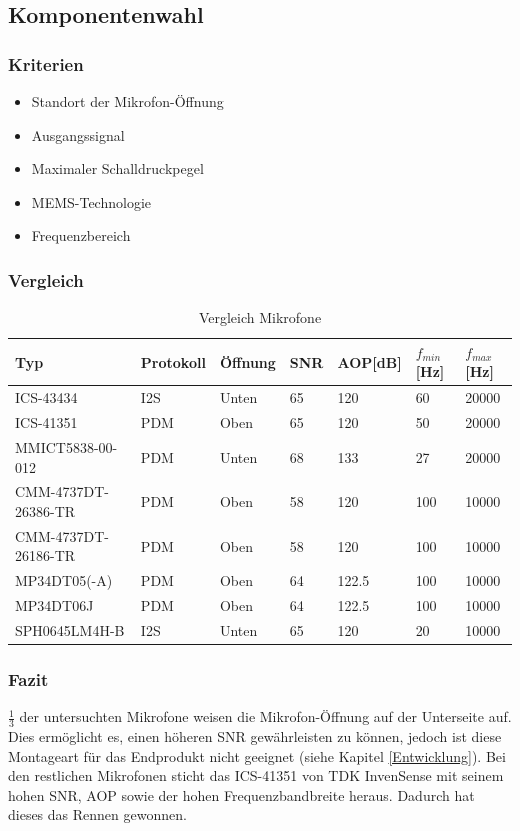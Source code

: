 \documentclass[12pt]{article}
\begin{document}
	\subsection{Komponentenwahl}
	\subsubsection{Kriterien}
	\begin{itemize}
		\item Standort der Mikrofon-Öffnung
		\item Ausgangssignal
		\item Maximaler Schalldruckpegel
		\item MEMS-Technologie
		\item Frequenzbereich
	\end{itemize}
	\subsubsection{Vergleich}
	\begin{table}[H]
		\centering
		\begin{tabular}{|l|l|l|l|l|l|l|}
			\hline
			\textbf{Typ} & \textbf{Protokoll} & \textbf{Öffnung} & \textbf{SNR} & \textbf{AOP[dB]} & \textbf{$f_{min}$ [Hz]} & \textbf{$f_{max}$[Hz]} \\\hline
	ICS-43434 & I2S & Unten & 65 & 120 & 60 & 20000 \\ \hline
	ICS-41351 & PDM & Oben & 65 & 120 & 50 & 20000 \\ \hline
	MMICT5838-00-012 & PDM & Unten & 68 & 133 & 27 & 20000 \\ \hline
	CMM-4737DT-26386-TR & PDM & Oben & 58 & 120 & 100 & 10000 \\ \hline
	CMM-4737DT-26186-TR & PDM & Oben & 58 & 120 & 100 & 10000 \\ \hline
	MP34DT05(-A) & PDM & Oben & 64 & 122.5 & 100 & 10000 \\ \hline
	MP34DT06J & PDM & Oben & 64 & 122.5 & 100 & 10000 \\ \hline
	SPH0645LM4H-B & I2S & Unten & 65 & 120 & 20 & 10000 \\ \hline
	\end{tabular}
	\caption{Vergleich Mikrofone}
	\label{table:vergleich-mikrofone}
\end{table}

	\subsubsection{Fazit}
	$\frac{1}{3}$ der untersuchten Mikrofone weisen die Mikrofon-Öffnung auf der Unterseite auf. Dies ermöglicht es, einen höheren SNR gewährleisten zu können, jedoch ist diese Montageart für das Endprodukt nicht geeignet (siehe Kapitel \ref{Entwicklung}). Bei den restlichen Mikrofonen sticht das ICS-41351 von TDK InvenSense mit seinem hohen SNR, AOP sowie der hohen Frequenzbandbreite heraus. Dadurch hat dieses das Rennen gewonnen.
	\newpage
\end{document}
